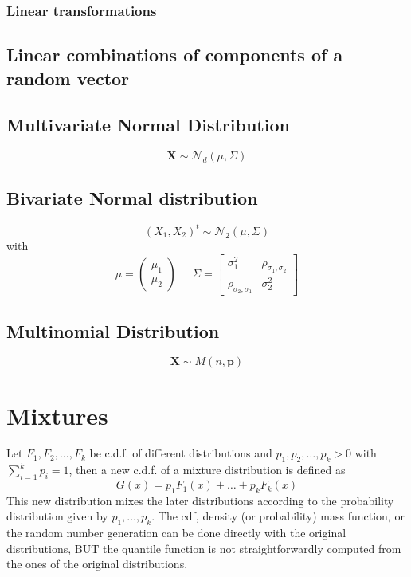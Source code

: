 \subsubsection{Linear transformations}

\subsection{Linear combinations of components of a random vector}

\subsection{Multivariate Normal Distribution}
\[ \textbf{X} \sim \mathcal{N}_d(\mu,\Sigma)\]

\subsection{Bivariate Normal distribution}
\[ (X_1,X_2)^t \sim \mathcal{N}_2(\mu,\Sigma) \] with
\[ \mu=\begin{pmatrix}\mu_1\\\mu_2\end{pmatrix}\;\;\;\;\; \Sigma=\begin{bmatrix}
    \sigma_1^2 & \rho_{\sigma_1,\sigma_2}\\
        \rho_{\sigma_2,\sigma_1} & \sigma^2_2
    \end{bmatrix}
\]

\subsection{Multinomial Distribution}
\[ \textbf{X} \sim M(n,\textbf{p}) \]

\section{Mixtures}
Let $F_1,F_2,\dots,F_k$ be c.d.f. of different distributions and
$p_1,p_2,\dots,p_k>0$ with $\sum_{i=1}^kp_i=1$, then a new c.d.f. of a mixture
distribution is defined as
\[ G(x) = p_1F_1(x) + \dots + p_kF_k(x) \] This new distribution mixes the later
distributions according to the probability distribution given by
$p_1,\dots,p_k$. The cdf, density (or probability) mass function, or the random
number generation can be done directly with the original distributions, BUT the
quantile function is not straightforwardly computed from the ones of the original
distributions. 

